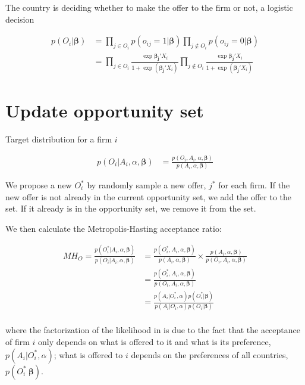 \documentclass[12pt]{article}
\begin{document}
The country is deciding whether to make the offer to the firm or not, a logistic decision

\begin{align}
p(O_i | \bm{\beta}) &= \prod_{j \in O_i} p(o_{ij} = 1 | \bm{\beta}) \prod_{j \notin O_i} p(o_{ij} = 0 | \bm{\beta}) \\
&= \prod_{j \in O_i} \frac{\exp{\bm{\beta_j} ' X_i}}{1 + \exp(\bm{\beta_j}' X_i)}
 \prod_{j \notin O_i} \frac{\exp{\bm{\beta_j} ' X_i}}{1 + \exp(\bm{\beta_j}' X_i)} \label{eq:conditional_probability_of_offer}
\end{align}
\section{Update opportunity set}

Target distribution for a firm $i$ 

\begin{align}
p(O_i | A_i, \alpha, \bm{\beta}) &= \frac{p(O_i, A_i, \alpha, \bm{\beta})}{p(A_i, \alpha, \bm{\beta})}
\end{align}

We propose a new $O_i^*$ by randomly sample a new offer, $j^*$ for each firm. If the new offer is not already in the current opportunity set, we add the offer to the set. If it already is in the opportunity set, we remove it from the set.

We then calculate the Metropolis-Hasting acceptance ratio:

\begin{align}
MH_O = \frac{p(O_i^* | A_i, \alpha, \bm{\beta})}{p(O_i | A_i, \alpha, \bm{\beta})} &= \frac{p(O_i^*, A_i, \alpha, \bm{\beta})}{p(A_i, \alpha, \bm{\beta})} \times \frac{p(A_i, \alpha, \bm{\beta})}{p(O_i, A_i, \alpha, \bm{\beta})} \\
&= \frac{p(O_i^*, A_i, \alpha, \bm{\beta})}{p(O_i, A_i, \alpha, \bm{\beta})} \\
&= \frac{p(A_i | O_i^*, \alpha)p(O_i^*|\bm{\beta})}{p(A_i | O_i, \alpha)p(O_i|\bm{\beta})} \label{eq:updateO_joint_dist_into_conditional_dist} \\
\end{align}

where the factorization of the likelihood in  is due to the fact that the acceptance of firm $i$ only depends on what is offered to it and what is its preference, $p(A_i | O_i^*, \alpha)$; what is offered to $i$ depends on the preferences of all countries, $p(O_i^* \ \bm{\beta})$.
\end{document}
